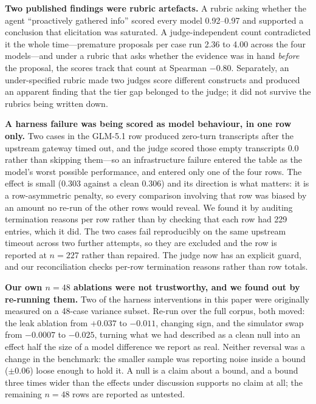 \documentclass{article} %
\begin{document}
\textbf{Two published findings were rubric artefacts.} A rubric asking
whether the agent ``proactively gathered info'' scored every model
0.92--0.97 and supported a conclusion that elicitation was saturated.
A judge-independent count contradicted it the whole time---premature
proposals per case run 2.36 to 4.00 across the four models---and under a
rubric that asks whether the evidence was in hand \emph{before} the
proposal, the scores track that count at Spearman $-0.80$. Separately, an
under-specified rubric made two judges score different constructs and
produced an apparent finding that the tier gap belonged to the judge; it
did not survive the rubrics being written down.

\textbf{A harness failure was being scored as model behaviour, in one row
only.} Two cases in the GLM-5.1 row produced zero-turn transcripts after
the upstream gateway timed out, and the judge scored those empty
transcripts $0.0$ rather than skipping them---so an infrastructure
failure entered the table as the model's worst possible performance, and
entered only one of the four rows. The effect is small ($0.303$ against
a clean $0.306$) and its direction is what matters: it is a
row-asymmetric penalty, so every comparison involving that row was
biased by an amount no re-run of the other rows would reveal. We found it
by auditing termination reasons per row rather than by checking that each
row had 229 entries, which it did. The two cases fail reproducibly on the
same upstream timeout across two further attempts, so they are excluded
and the row is reported at $n=227$ rather than repaired. The judge now
has an explicit guard, and our reconciliation checks per-row termination
reasons rather than row totals.

\textbf{Our own $n=48$ ablations were not trustworthy, and we found out
by re-running them.} Two of the harness interventions in this paper were
originally measured on a 48-case variance subset. Re-run over the full
corpus, both moved: the leak ablation from $+0.037$ to $-0.011$, changing
sign, and the simulator swap from $-0.0007$ to $-0.025$, turning what we
had described as a clean null into an effect half the size of a model
difference we report as real. Neither reversal was a change in the
benchmark: the smaller sample was reporting noise inside a bound
($\pm0.06$) loose enough to hold it. A null is a claim about a bound, and
a bound three times wider than the effects under discussion supports no
claim at all; the remaining $n=48$ rows are reported as untested.
\end{document}
